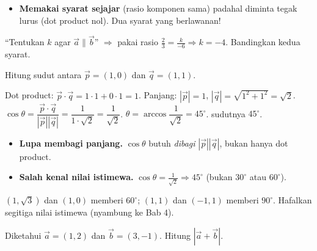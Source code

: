 \begin{jebakan}
\begin{itemize}[leftmargin=*,topsep=2pt]
  \item \textbf{Memakai syarat sejajar} (rasio komponen sama) padahal diminta
  tegak lurus (dot product nol). Dua syarat yang berlawanan!
\end{itemize}
\end{jebakan}

\begin{variasi}
``Tentukan $k$ agar $\vec a\parallel\vec b$'' $\Rightarrow$ pakai rasio
$\frac{2}{3}=\frac{k}{-6}\Rightarrow k=-4$. Bandingkan kedua syarat.
\end{variasi}

\begin{soalbox}{}
Hitung sudut antara $\vec p=(1,0)$ dan $\vec q=(1,1)$.
\end{soalbox}

\jawab
{} Dot product: $\vec p\cdot\vec q=1\cdot1+0\cdot1=1$.
 Panjang: $|\vec p|=1$, $|\vec q|=\sqrt{1^2+1^2}=\sqrt2$.
 $\cos\theta=\dfrac{\vec p\cdot\vec q}{|\vec p||\vec q|}
=\dfrac{1}{1\cdot\sqrt2}=\dfrac{1}{\sqrt2}$.
 $\theta=\arccos\dfrac{1}{\sqrt2}=45^\circ$.
\jadi sudutnya $45^\circ$.

\begin{jebakan}
\begin{itemize}[leftmargin=*,topsep=2pt]
  \item \textbf{Lupa membagi panjang.} $\cos\theta$ butuh \emph{dibagi}
  $|\vec p||\vec q|$, bukan hanya dot product.
  \item \textbf{Salah kenal nilai istimewa.} $\cos\theta=\frac{1}{\sqrt2}
  \Rightarrow45^\circ$ (bukan $30^\circ$ atau $60^\circ$).
\end{itemize}
\end{jebakan}

\begin{variasi}
$(1,\sqrt3)$ dan $(1,0)$ memberi $60^\circ$; $(1,1)$ dan $(-1,1)$ memberi
$90^\circ$. Hafalkan segitiga nilai istimewa (nyambung ke Bab 4).
\end{variasi}

\begin{soalbox}{}
Diketahui $\vec a=(1,2)$ dan $\vec b=(3,-1)$. Hitung $|\vec a+\vec b|$.
\end{soalbox}

